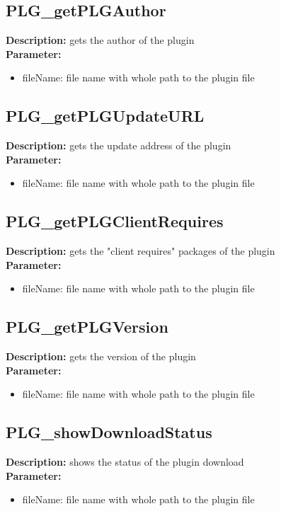 \subsection{PLG\_getPLGAuthor}
\textbf{Description:} gets the author of the plugin\\
\textbf{Parameter:}
\begin{itemize}
\item fileName: file name with whole path to the plugin file
\end{itemize}

\subsection{PLG\_getPLGUpdateURL}
\textbf{Description:} gets the update address of the plugin\\
\textbf{Parameter:}
\begin{itemize}
\item fileName: file name with whole path to the plugin file
\end{itemize}

\subsection{PLG\_getPLGClientRequires}
\textbf{Description:} gets the "client requires" packages of the plugin\\
\textbf{Parameter:}
\begin{itemize}
\item fileName: file name with whole path to the plugin file
\end{itemize}

\subsection{PLG\_getPLGVersion}
\textbf{Description:} gets the version of the plugin\\
\textbf{Parameter:}
\begin{itemize}
\item fileName: file name with whole path to the plugin file
\end{itemize}

\subsection{PLG\_showDownloadStatus}
\textbf{Description:} shows the status of the plugin download\\
\textbf{Parameter:}
\begin{itemize}
\item fileName: file name with whole path to the plugin file
\end{itemize}

